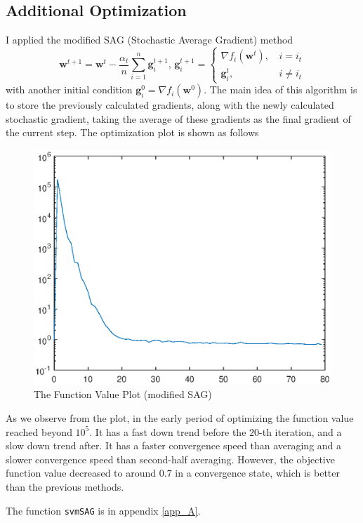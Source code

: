 \documentclass[10pt]{article}
\begin{document}
\subsection{Additional Optimization}
I applied the modified SAG (Stochastic Average Gradient) method \cite{roux2012stochastic}
$$
\mathbf{w}^{t+1} = \mathbf{w}^t - \frac{\alpha_t}n\sum\limits_{i=1}^n\mathbf{g}_i^{t + 1}, \, \mathbf{g}_i^{t + 1} = \begin{cases}
\nabla f_i\left(\mathbf{w}^t\right),&\, i = i_t
\\
\mathbf{g}_i^{t},&\, i \neq i_t
\end{cases}
$$
with another initial condition $\mathbf{g}_i^{0} = \nabla f_i\left(\mathbf{w}^0\right)$. The main idea of this algorithm is to store the previously calculated gradients, along with the newly calculated stochastic gradient, taking the average of these gradients as the final gradient of the current step. The optimization plot is shown as follows
\begin{figure}[H]
\centering
\includegraphics[scale=.65]{bonus3.eps}
\caption{The Function Value Plot (modified SAG)}
\label{bonus3}
\end{figure}
As we observe from the plot, in the early period of optimizing the function value reached beyond $10^5$. It has a fast down trend before the $20$-th iteration, and a slow down trend after. It has a faster convergence speed than averaging and a slower convergence speed than second-half averaging. However, the objective function value decreased to around $0.7$ in a convergence state, which is better than the previous methods.\par
The function \texttt{svmSAG} is in appendix \ref{app_A}.
\medskip


\clearpage
\appendix
\end{document}
